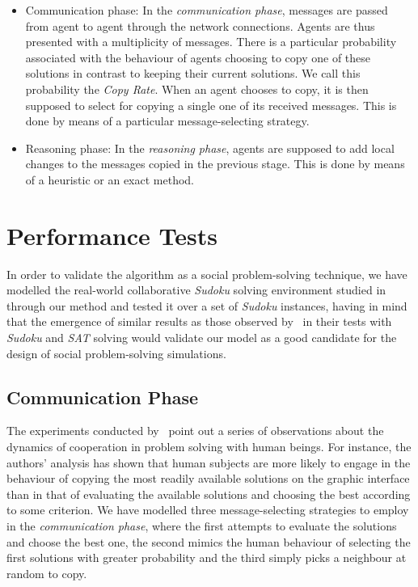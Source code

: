 \documentclass{article}
\begin{document}
\begin{itemize}
\item
Communication phase: In the {\em communication phase}, messages are passed from agent to agent through the network connections. Agents are thus presented with a multiplicity of messages. There is a particular probability associated with the behaviour of agents choosing to copy one of these solutions in contrast to keeping their current solutions. We call this probability the {\em Copy Rate}. When an agent chooses to copy, it is then supposed to select for copying a single one of its received messages. This is done by means of a particular message-selecting strategy.

\item
Reasoning phase: In the {\em reasoning phase}, agents are supposed to add local changes to the messages copied in the previous stage. This is done by means of a heuristic or an exact method.
\end{itemize}

\section{Performance Tests}
\label{sec:apply}

In order to validate the algorithm as a social problem-solving technique, we have modelled the real-world collaborative {\em Sudoku} solving environment studied in~\cite{farenzena:collabem} through our method and tested it over a set of {\em Sudoku} instances, having in mind that the emergence of similar results as those observed by~\cite{farenzena:collabem} in their tests with {\em Sudoku} and {\em SAT} solving would validate our model as a good candidate for the design of social problem-solving simulations.

\subsection{Communication Phase} %

The experiments conducted by~\cite{farenzena:collabem} point out a series of observations about the dynamics of cooperation in problem solving with human beings. For instance, the authors' analysis has shown that human subjects are more likely to engage in the behaviour of copying the most readily available solutions on the graphic interface than in that of evaluating the available solutions and choosing the best according to some criterion. We have modelled three message-selecting strategies to employ in the \emph{communication phase}, where the first attempts to evaluate the solutions and choose the best one, the second mimics the human behaviour of selecting the first solutions with greater probability and the third simply picks a neighbour at random to copy.
\end{document}

